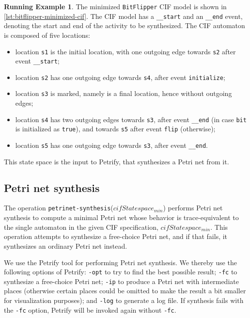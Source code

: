 \documentclass{article}
\newcommand{\keyw}[1]{\texttt{#1}}
\newcommand{\var}[1]{\ensuremath{\mathit{#1}}}
\newcommand{\petrinetSynthesisLabel}[0]{\keyw{petrinet-synthesis}}
\newcommand{\petrinetSynthesis}[1]{\petrinetSynthesisLabel(\ensuremath{#1})}
\theoremstyle{definition}
\newtheorem*{example*}{Running Example}
\begin{document}
\begin{example*}
The minimized \texttt{BitFlipper} CIF model is shown in \autoref{lst:bitflipper-minimized-cif}.
The CIF model has a \texttt{\_\_start} and an \texttt{\_\_end} event, denoting the start and end of the activity to be synthesized.
The CIF automaton is composed of five locations:
\begin{itemize}
    \item location \texttt{s1} is the initial location, with one outgoing edge towards \texttt{s2} after event \texttt{\_\_start};
    \item location \texttt{s2} has one outgoing edge towards \texttt{s4}, after event \texttt{initialize};
    \item location \texttt{s3} is marked, namely is a final location, hence without outgoing edges;
    \item location \texttt{s4} has two outgoing edges towards \texttt{s3}, after event \texttt{\_\_end} (in case \texttt{bit} is initialized as \texttt{true}), and towards \texttt{s5} after event \texttt{flip} (otherwise);
    \item location \texttt{s5} has one outgoing edge towards \texttt{s3}, after event \texttt{\_\_end}.
\end{itemize}
This state space is the input to Petrify, that synthesizes a Petri net from it.
\end{example*}


\subsection{Petri net synthesis}
\label{sec:petrinet-synthesis}

The operation \petrinetSynthesis{\var{cifStatespace_{min}}} performs Petri net synthesis to compute a minimal Petri net whose behavior is trace-equivalent to the single automaton in the given CIF specification, \var{cifStatespace_{min}}.
This operation attempts to synthesize a free-choice Petri net, and if that fails, it synthesizes an ordinary Petri net instead.

We use the Petrify tool for performing Petri net synthesis.
We thereby use the following options of Petrify: \texttt{-opt} to try to find the best possible result; \texttt{-fc} to synthesize a free-choice Petri net;
\texttt{-ip} to produce a Petri net with intermediate places (otherwise certain places could be omitted to make the result a bit smaller for visualization purposes); and \texttt{-log} to generate a log file.
If synthesis fails with the \texttt{-fc} option, Petrify will be invoked again without \texttt{-fc}.
\end{document}
